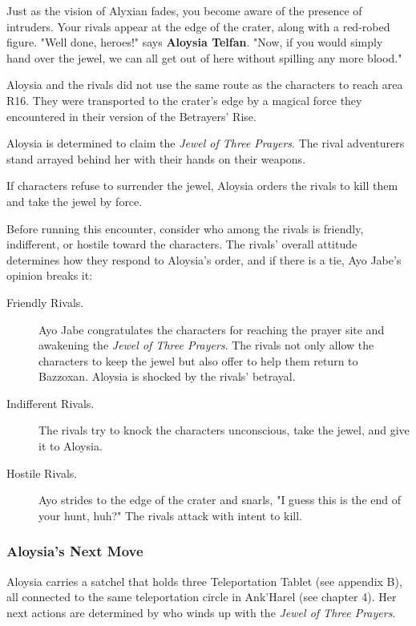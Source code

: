 \documentclass[10pt,a4paper,twoside,bg=print,twocolumn,openany,nodeprecatedcode]{dndbook}
\begin{document}
\begin{DndReadAloud}{}
Just as the vision of Alyxian fades, you become aware of the presence of intruders. Your rivals appear at the edge of the crater, along with a red-robed figure. "Well done, heroes!" says \textbf{Aloysia Telfan}. "Now, if you would simply hand over the jewel, we can all get out of here without spilling any more blood."

\end{DndReadAloud}

Aloysia and the rivals did not use the same route as the characters to reach area R16. They were transported to the crater's edge by a magical force they encountered in their version of the Betrayers' Rise.

Aloysia is determined to claim the \textit{Jewel of Three Prayers}. The rival adventurers stand arrayed behind her with their hands on their weapons.

If characters refuse to surrender the jewel, Aloysia orders the rivals to kill them and take the jewel by force.

Before running this encounter, consider who among the rivals is friendly, indifferent, or hostile toward the characters. The rivals' overall attitude determines how they respond to Aloysia's order, and if there is a tie, Ayo Jabe's opinion breaks it:


\begin{description}
\item[Friendly Rivals.]
Ayo Jabe congratulates the characters for reaching the prayer site and awakening the \textit{Jewel of Three Prayers}. The rivals not only allow the characters to keep the jewel but also offer to help them return to Bazzoxan. Aloysia is shocked by the rivals' betrayal.
\item[Indifferent Rivals.]
The rivals try to knock the characters unconscious, take the jewel, and give it to Aloysia.
\item[Hostile Rivals.]
Ayo strides to the edge of the crater and snarls, "I guess this is the end of your hunt, huh?" The rivals attack with intent to kill.
\end{description}

\subsubsection{Aloysia's Next Move}
Aloysia carries a satchel that holds three Teleportation Tablet (see appendix B), all connected to the same teleportation circle in Ank'Harel (see chapter 4). Her next actions are determined by who winds up with the \textit{Jewel of Three Prayers}.
\end{document}
